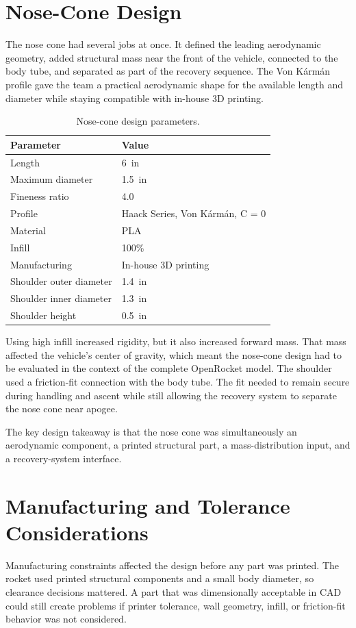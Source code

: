 \documentclass[11pt]{article}
\begin{document}
\section{Nose-Cone Design}
The nose cone had several jobs at once. It defined the leading aerodynamic geometry, added structural mass near the front of the vehicle, connected to the body tube, and separated as part of the recovery sequence. The Von Kármán profile gave the team a practical aerodynamic shape for the available length and diameter while staying compatible with in-house 3D printing.

\begin{table}[H]
\centering
\caption{Nose-cone design parameters.}
\small
\begin{tabular}{ll}
\toprule
Parameter & Value \\
\midrule
Length & \SI{6}{in} \\
Maximum diameter & \SI{1.5}{in} \\
Fineness ratio & 4.0 \\
Profile & Haack Series, Von Kármán, C = 0 \\
Material & PLA \\
Infill & 100\% \\
Manufacturing & In-house 3D printing \\
Shoulder outer diameter & \SI{1.4}{in} \\
Shoulder inner diameter & \SI{1.3}{in} \\
Shoulder height & \SI{0.5}{in} \\
\bottomrule
\end{tabular}
\end{table}

Using high infill increased rigidity, but it also increased forward mass. That mass affected the vehicle's center of gravity, which meant the nose-cone design had to be evaluated in the context of the complete OpenRocket model. The shoulder used a friction-fit connection with the body tube. The fit needed to remain secure during handling and ascent while still allowing the recovery system to separate the nose cone near apogee.

The key design takeaway is that the nose cone was simultaneously an aerodynamic component, a printed structural part, a mass-distribution input, and a recovery-system interface.

\section{Manufacturing and Tolerance Considerations}
Manufacturing constraints affected the design before any part was printed. The rocket used printed structural components and a small body diameter, so clearance decisions mattered. A part that was dimensionally acceptable in CAD could still create problems if printer tolerance, wall geometry, infill, or friction-fit behavior was not considered.
\end{document}
